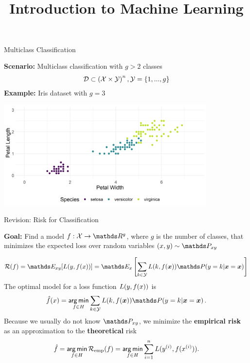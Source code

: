 



\newcommand{\titlefigure}{figure/iris_scatter.png}
\newcommand{\learninggoals}{
  \item Know what multiclass means and which types of classifiers exist
  \item Know the MC 0-1-loss
  \item Know the MC brier score
  \item Know the MC logarithmic loss
}

\title{Introduction to Machine Learning}
\date{}





\sloppy 

\begin{vbframe}{Multiclass Classification}

\textbf{Scenario:} Multiclass classification with $g > 2$ classes
$$\mathcal{D} \subset \left(\mathcal{X} \times \mathcal{Y}\right)^n, \mathcal{Y} = \{1, ..., g\}$$ 
\textbf{Example:} Iris dataset with $g = 3$

\vspace*{0.1cm}
\begin{center}
\includegraphics[width = 11cm ]{figure/iris_scatter.png}
\end{center}

\end{vbframe}

\begin{vbframe}{Revision: Risk for Classification}

\textbf{Goal:} Find a model  $f: \Xspace \to \R^g$, where $g$ is the number of classes, that minimizes the expected loss over random variables $\xy \sim \Pxy$ 

$$
 \riskf = \E_{xy}[\Lxy] = \E_{x}\left[\sum_{k \in \Yspace} L(k, f(\bm{x})) \P(y = k| \xv = \xv)\right] 
$$
The optimal model for a loss function $L(y, f(x))$ is
$$
  \fxh = \argmin_{f \in \Hspace} \sum_{k \in \Yspace} L(k, f(\bm{x})) \P(y = k| \xv = \xv)\,. $$
Because we usually do not know $\Pxy$, we minimize the \textbf{empirical risk} as an approximation to the \textbf{theoretical} risk
$$
\hat{f} = \mathop{\sf arg\,min}_{f \in H} \mathcal{R}_{\text{emp}}(f) = \mathop{\sf arg\,min}_{f \in H} \sum_{i=1}^n L(y^{(i)}, f(x^{(i)})).
$$
\end{vbframe}


